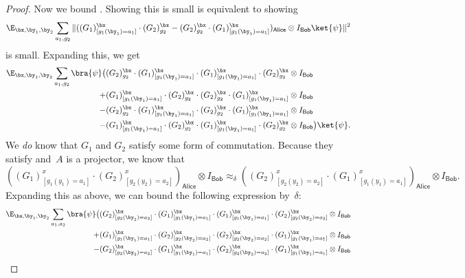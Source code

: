 \documentclass[11pt]{article}
\newcommand{\reg}[1]{{\mathsf{#1}}}
\begin{document}
\begin{proof}
Now we bound .
Showing this is small is equivalent to showing
\begin{equation*}
\E_{\bx, \by_1, \by_2}
\sum_{a_1, g_2}\Vert ((G_1)^{\bx}_{[g_1(\by_1) = a_1]}
	\cdot (G_2)^{\bx}_{g_2}- (G_2)^{\bx}_{g_2} \cdot (G_1)^{\bx}_{[g_1(\by_1) = a_1]})_{\reg{Alice}} \otimes I_{\reg{Bob}} \ket{\psi} \Vert^2
\end{equation*}
is small.  Expanding this, we get
\begin{align}
\E_{\bx, \by_1, \by_2} \sum_{a_1, g_2} \bra{\psi}\big(
	&(G_2)^{\bx}_{g_2} \cdot (G_1)^{\bx}_{[g_1(\by_1) = a_1]} \cdot (G_1)^{\bx}_{[g_1(\by_1) = a_1]} \cdot (G_2)^{\bx}_{g_2} \otimes I_{\reg{Bob}}\nonumber\\
	+ &(G_1)^{\bx}_{[g_1(\by_1) = a_1]} \cdot (G_2)^{\bx}_{g_2} \cdot (G_2)^{\bx}_{g_2} \cdot (G_1)^{\bx}_{[g_1(\by_1) = a_1]} \otimes I_{\reg{Bob}}\nonumber\\
	- &(G_2)^{\bx}_{g_2} \cdot (G_1)^{\bx}_{[g_1(\by_1) = a_1]} \cdot (G_2)^{\bx}_{g_2} \cdot (G_1)^{\bx}_{[g_1(\by_1) = a_1]} \otimes I_{\reg{Bob}}\nonumber\\
	- &(G_1)^{\bx}_{[g_1(\by_1) = a_1]} \cdot (G_2)^{\bx}_{g_2} \cdot (G_1)^{\bx}_{[g_1(\by_1) = a_1]} \cdot (G_2)^{\bx}_{g_2} \otimes I_{\reg{Bob}} \big)\ket{\psi}.\label{eq:burger-king}
\end{align}
We \emph{do} know that $G_1$ and $G_2$ satisfy some form of commutation.
Because they satisfy  and~$A$ is a projector, 
we know that
\begin{equation*}
((G_1)^x_{[g_1(y_1)=a_1]} \cdot (G_2)^x_{[g_2(y_2) = a_2]})_{\reg{Alice}} \otimes I_{\reg{Bob}}
\approx_{\delta} ((G_2)^x_{[g_2(y_2) = a_2]} \cdot (G_1)^x_{[g_1(y_1)=a_1]})_{\reg{Alice}} \otimes I_{\reg{Bob}}.
\end{equation*}
Expanding this as above, we can bound the following expression by~$\delta$:
\begin{align}
\E_{\bx, \by_1, \by_2} \sum_{a_1, a_2} \bra{\psi}\big(
	&(G_2)^\bx_{[g_2(\by_2) = a_2]} \cdot (G_1)^{\bx}_{[g_1(\by_1) = a_1]} \cdot (G_1)^{\bx}_{[g_1(\by_1) = a_1]} \cdot (G_2)^\bx_{[g_2(\by_2) = a_2]} \otimes I_{\reg{Bob}}\nonumber\\
	+ &(G_1)^{\bx}_{[g_1(\by_1) = a_1]} \cdot (G_2)^\bx_{[g_2(\by_2) = a_2]} \cdot (G_2)^\bx_{[g_2(\by_2) = a_2]} \cdot (G_1)^{\bx}_{[g_1(\by_1) = a_1]} \otimes I_{\reg{Bob}}\nonumber\\
	- &(G_2)^\bx_{[g_2(\by_2) = a_2]} \cdot (G_1)^{\bx}_{[g_1(\by_1) = a_1]} \cdot (G_2)^\bx_{[g_2(\by_2) = a_2]} \cdot (G_1)^{\bx}_{[g_1(\by_1) = a_1]} \otimes I_{\reg{Bob}}\nonumber\\

\end{align}
\end{proof}
\end{document}
